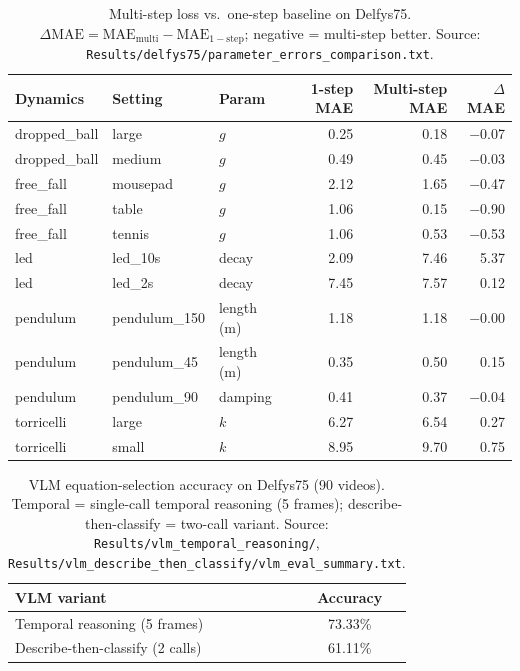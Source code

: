 \begin{table}[t]
  \centering
  \caption{Multi-step loss vs.\ one-step baseline on Delfys75. $\Delta\mathrm{MAE} = \mathrm{MAE}_{\mathrm{multi}} - \mathrm{MAE}_{\mathrm{1-step}}$; negative = multi-step better. Source: \texttt{Results/delfys75/parameter\_errors\_comparison.txt}.}
  \label{tab:multistep_ablation}
  \small
  \begin{tabular}{@{}lllrrr@{}}
    \toprule
    Dynamics & Setting & Param & 1-step MAE & Multi-step MAE & $\Delta$MAE \\
    \midrule
    dropped\_ball & large & $g$ & 0.25 & 0.18 & $-$0.07 \\
    dropped\_ball & medium & $g$ & 0.49 & 0.45 & $-$0.03 \\
    free\_fall & mousepad & $g$ & 2.12 & 1.65 & $-$0.47 \\
    free\_fall & table & $g$ & 1.06 & 0.15 & $-$0.90 \\
    free\_fall & tennis & $g$ & 1.06 & 0.53 & $-$0.53 \\
    led & led\_10s & decay & 2.09 & 7.46 & 5.37 \\
    led & led\_2s & decay & 7.45 & 7.57 & 0.12 \\
    pendulum & pendulum\_150 & length (m) & 1.18 & 1.18 & $-$0.00 \\
    pendulum & pendulum\_45 & length (m) & 0.35 & 0.50 & 0.15 \\
    pendulum & pendulum\_90 & damping & 0.41 & 0.37 & $-$0.04 \\
    torricelli & large & $k$ & 6.27 & 6.54 & 0.27 \\
    torricelli & small & $k$ & 8.95 & 9.70 & 0.75 \\
    \bottomrule
  \end{tabular}
\end{table}

\begin{table}[t]
  \centering
  \caption{VLM equation-selection accuracy on Delfys75 (90 videos). Temporal = single-call temporal reasoning (5 frames); describe-then-classify = two-call variant. Source: \texttt{Results/vlm\_temporal\_reasoning/}, \texttt{Results/vlm\_describe\_then\_classify/vlm\_eval\_summary.txt}.}
  \label{tab:vlm_accuracy}
  \begin{tabular}{@{}lc@{}}
    \toprule
    VLM variant & Accuracy \\
    \midrule
    Temporal reasoning (5 frames) & 73.33\% \\
    Describe-then-classify (2 calls) & 61.11\% \\
    \bottomrule
  \end{tabular}
\end{table}

